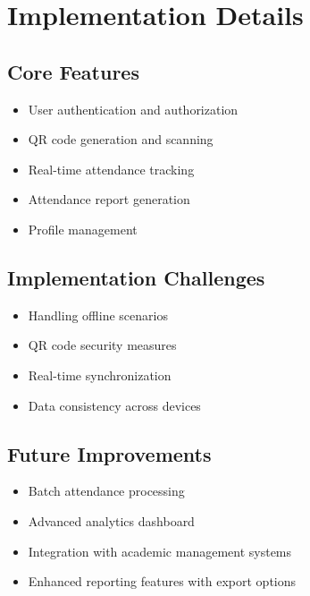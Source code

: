 \section{Implementation Details}
\label{sec:implementation}
\subsection{Core Features}
\begin{itemize}
    \item User authentication and authorization
    \item QR code generation and scanning
    \item Real-time attendance tracking
    \item Attendance report generation
    \item Profile management
\end{itemize}

\subsection{Implementation Challenges}
\begin{itemize}
    \item Handling offline scenarios
    \item QR code security measures
    \item Real-time synchronization
    \item Data consistency across devices
\end{itemize}

\subsection{Future Improvements}
\begin{itemize}
    \item Batch attendance processing
    \item Advanced analytics dashboard
    \item Integration with academic management systems
    \item Enhanced reporting features with export options
\end{itemize}